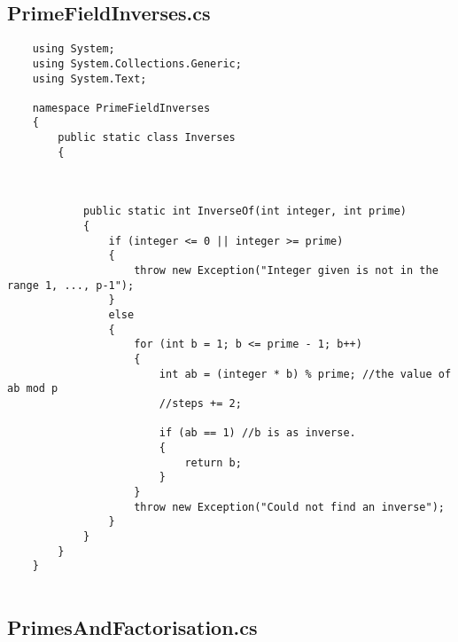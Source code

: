 \documentclass{article}
\begin{document}
\subsection{PrimeFieldInverses.cs}

\begin{lstlisting}
	using System;
	using System.Collections.Generic;
	using System.Text;
	
	namespace PrimeFieldInverses
	{
		public static class Inverses
		{
			
			
			
			public static int InverseOf(int integer, int prime)
			{
				if (integer <= 0 || integer >= prime)
				{
					throw new Exception("Integer given is not in the range 1, ..., p-1");
				}
				else
				{
					for (int b = 1; b <= prime - 1; b++)
					{
						int ab = (integer * b) % prime; //the value of ab mod p
						//steps += 2;
						
						if (ab == 1) //b is as inverse.
						{
							return b;
						}
					}
					throw new Exception("Could not find an inverse");
				}
			}
		}
	}
	
\end{lstlisting}

\subsection{PrimesAndFactorisation.cs}
\end{document}
